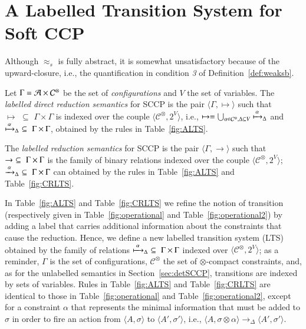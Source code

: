 \documentclass[main.tex]{subfiles}
\begin{document}
\section{A Labelled Transition System for Soft CCP}\label{sec:ltsSCCP}\label{sec:4}
Although $\approx_{\mathit{s}}$ is fully abstract, it is somewhat unsatisfactory
because of the upward-closure, i.e., the quantification in condition \emph{3} of Definition~\ref{def:weaksb}.

\begin{definition}
	Let $\Gamma = {\mathcal A} \times {\mathcal C}^\otimes$ be the set of \emph{configurations} and $V$ the set of variables.
	The  \emph{labelled direct reduction semantics} for SCCP is the pair 
	$\langle \Gamma,  \mapsto \rangle$
	such that $\mapsto \, \, \subseteq \, \,\Gamma \times \Gamma$ is indexed over the couple
	$\langle \mathcal{C}^\otimes, 2^V \rangle$,
	i.e., $\mapsto = \bigcup_{\alpha \in \mathcal{C}^\otimes, \Delta \subseteq V} \xmapsto{\, \alpha\,}_\Delta$ and 
	$\xmapsto{\,\alpha\,}_\Delta \, \, \subseteq \, \,\Gamma \times \Gamma$, obtained by the rules in 
	Table~\ref{fig:ALTS}.
	
	The \emph{labelled reduction semantics} for SCCP is the pair 
	$\langle \Gamma,  \rightarrow \rangle$
	such that $\rightarrow \, \, \subseteq \, \,\Gamma \times   \Gamma$ is the family 
	of binary relations indexed over the couple
	$\langle \mathcal{C}^\otimes, 2^V \rangle$;
	$\xrightarrow{\,\alpha\,}_\Delta \, \, \subseteq \, \,\Gamma \times \Gamma$ can obtained by the rules in 
	Table~\ref{fig:ALTS} and Table~\ref{fig:CRLTS}.
\end{definition}


In Table~\ref{fig:ALTS} and Table~\ref{fig:CRLTS} we refine the notion of transition (respectively given in Table~\ref{fig:operational} and Table~\ref{fig:operational2})
by adding a label that carries additional information about the constraints that cause the reduction.
Hence, we define a new labelled transition system (LTS) obtained by the family of relations
$\xmapsto{\;  \alpha \;}_\Delta \, \, \subseteq \, \,\Gamma \times \Gamma$ indexed over 
$\langle \mathcal{C}^\otimes, 2^V \rangle$;
as a reminder, $\Gamma$ is the set of configurations, $\mathcal{C}^\otimes$ the set of $\otimes$-compact constraints, and,  as for the unlabelled semantics in Section~\ref{sec:detSCCP}, 
transitions are indexed by sets of variables.
Rules in Table~\ref{fig:ALTS} and Table~\ref{fig:CRLTS} are identical to those in Table~\ref{fig:operational} and Table~\ref{fig:operational2}, except for a constraint $\alpha$ that
represents the minimal information that must be added to $\sigma$ in order to fire an action
from $\langle A, \sigma\rangle$  to $\langle A', \sigma' \rangle$, i.e., $\langle A, \sigma \otimes \alpha\rangle \longrightarrow_\Delta \langle A' , \sigma' \rangle$.
\end{document}
